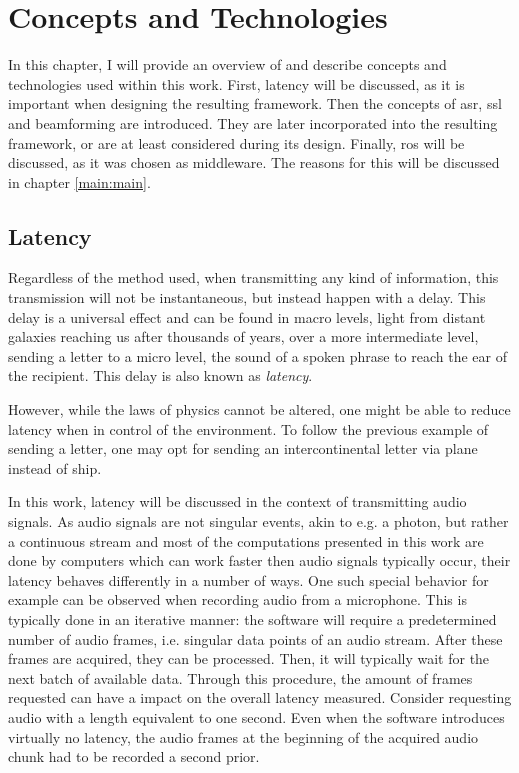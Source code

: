 

\chapter{Concepts and Technologies}
\label{basics:start}
In this chapter, I will provide an overview of and describe concepts and technologies used within this work.
First, latency will be discussed, as it is important when designing the resulting framework.
Then the concepts of \gls{asr}, \gls{ssl} and beamforming are introduced.
They are later incorporated into the resulting framework, or are at least considered during its design.
Finally, \gls{ros} will be discussed, as it was chosen as middleware. 
The reasons for this will be discussed in chapter \ref{main:main}.


\section{Latency}
\label{basics:latency}
Regardless of the method used, when transmitting any kind of information, this transmission will not be instantaneous, but instead happen with a delay.
This delay is a universal effect and can be found in macro levels, light from distant galaxies reaching us after thousands of years, over a more intermediate level, sending a letter to a micro level, the sound of a spoken phrase to reach the ear of the recipient.
This delay is also known as \textit{latency}.

However, while the laws of physics cannot be altered, one might be able to reduce latency when in control of the environment.
To follow the previous example of sending a letter, one may opt for sending an intercontinental letter via plane instead of ship.

In this work, latency will be discussed in the context of transmitting audio signals.
As audio signals are not singular events, akin to e.g. a photon, but rather a continuous stream and most of the computations presented in this work are done by computers which can work faster then audio signals typically occur, their latency behaves differently in a number of ways. %
One such special behavior for example can be observed when recording audio from a microphone.
This is typically done in an iterative manner:
the software will require a predetermined number of audio frames, i.e. singular data points of an audio stream.
After these frames are acquired, they can be processed.
Then, it will typically wait for the next batch of available data.
Through this procedure, the amount of frames requested can have a impact on the overall latency measured.
Consider requesting audio with a length equivalent to one second.
Even when the software introduces virtually no latency, the audio frames at the beginning of the acquired audio chunk had to be recorded a second prior.

